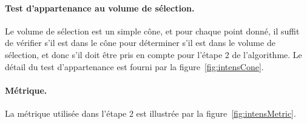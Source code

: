 	\paragraph{Test d'appartenance au volume de sélection.}
	Le volume de sélection est un simple cône, et pour chaque point donné, il suffit de vérifier s'il est dans le cône pour déterminer s'il est dans le volume de sélection, et donc s'il doit être pris en compte pour l'étape 2 de l'algorithme. Le détail du test d'appartenance est fourni par la figure~\ref{fig:intensCone}.
	
	\paragraph{Métrique.}
	La métrique utilisée dans l'étape 2 est illustrée par la figure~\ref{fig:intensMetric}.
	

